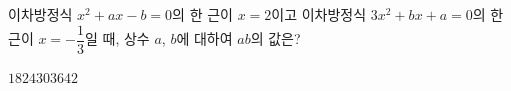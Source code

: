이차방정식 $x^2+ax-b=0$의 한 근이 $x=2$이고 이차방정식 $3x^2+bx+a=0$의 한 근이 $x=-\dfrac{1}{3}$일 때, 상수 $a$, $b$에 대하여 $ab$의 값은?
\begin{choices32}{$18$}{$24$}{$30$}{$36$}{$42$}\end{choices32}
